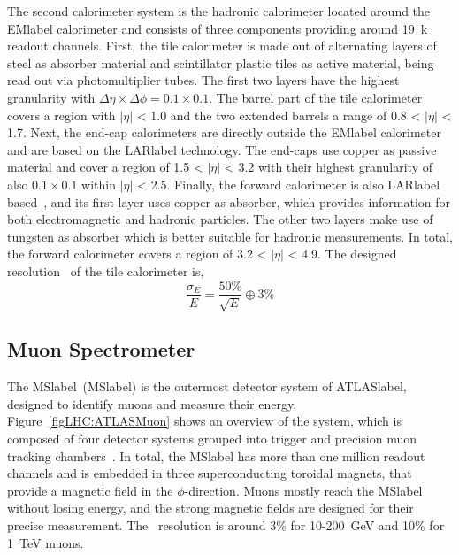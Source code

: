 The second calorimeter system is the hadronic calorimeter located around the \acrshort{EMlabel} calorimeter and consists of three components providing around 19~k readout channels. First, the tile calorimeter is made out of alternating layers of steel as absorber material and scintillator plastic tiles as active material, being read out via photomultiplier tubes. The first two layers have the highest granularity with $\Delta\eta\times\Delta\phi= 0.1\times 0.1$. The barrel part of the tile calorimeter covers a region with $|\eta|$ < 1.0 and the two extended barrels a range of 0.8 < $|\eta|$ < 1.7.
Next, the end-cap calorimeters are directly outside the \acrshort{EMlabel} calorimeter and are based on the \acrshort{LARlabel} technology. The end-caps use copper as passive material and cover a region of 1.5 < $|\eta|$ < 3.2 with their highest granularity of also $0.1\times 0.1$ within $|\eta|$ < 2.5. Finally, the forward calorimeter is also \acrshort{LARlabel} based~\cite{Artamonov_2008}, and its first layer uses copper as absorber, which provides information for both electromagnetic and hadronic particles. The other two layers make use of tungsten as absorber which is better suitable for hadronic measurements. In total, the forward calorimeter covers a region of 3.2 < $|\eta|$ < 4.9.
The designed resolution~\cite{Collaboration_2008} of the tile calorimeter is,
\begin{equation}
    \frac{\sigma_E}{E} = \frac{50\%}{\sqrt{E}}\oplus 3\%
\end{equation}


\subsection{Muon Spectrometer}

The \acrlong{MSlabel}~(\acrshort{MSlabel}) is the outermost detector system of \acrshort{ATLASlabel}, designed to identify muons and measure their energy. Figure~\ref{figLHC:ATLASMuon} shows an overview of the system, which is composed of four detector systems grouped into trigger and precision muon tracking chambers~\cite{CERN-LHCC-97-022,muoncommission}. In total, the \acrshort{MSlabel} has more than one million readout channels and is embedded in three superconducting toroidal magnets, that provide a magnetic field in the $\phi$-direction. Muons mostly reach the \acrshort{MSlabel} without losing energy, and the strong magnetic fields are designed for their precise measurement. The \pT\ resolution is around 3\% for 10-200~GeV and 10\% for 1~TeV muons. 

